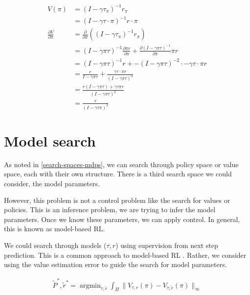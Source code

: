 \begin{align*}
V(\pi) &= (I − \gamma \tau_{\pi})^{−1}r_{\pi} \tag{value functional}\\
&= (I − \gamma \tau\cdot \pi)^{−1}r\cdot \pi \\
\frac{\partial V}{\partial \pi} &= \frac{\partial}{\partial \pi}((I-\gamma \tau_{\pi})^{-1} r_{\pi}) \\
&= (I-\gamma \pi \tau)^{-1} \frac{\partial \pi r}{\partial \pi}+   \frac{\partial (I-\gamma \pi \tau)^{-1}}{\partial \pi}\pi r\tag{product rule} \\
&= (I-\gamma \pi \tau)^{-1} r + -(I-\gamma \pi \tau)^{-2} \cdot -\gamma \tau\cdot \pi r\\
&= \frac{r}{I-\gamma \pi \tau} + \frac{ \gamma \tau\cdot \pi r}{(I-\gamma \pi \tau)^2} \tag{rewrite as fractions}\\
&= \frac{r(I-\gamma \pi \tau) + \gamma \tau \pi r}{(I-\gamma \pi \tau)^2} \tag{common demoninator}\\
& = \frac{r}{(I-\gamma \tau \pi)^2} \tag{cancel}
\end{align*}

\newpage
\section{Model search} \label{model-iteration}

As noted in \ref{search-spaces-mdps}, we can search through policy space or value
space, each with their own structure.
There is a third search space we could consider, the model parameters.

However, this problem is not a control problem like the search for values or policies.
This is an inference problem, we are trying to infer the model parameters.
Once we know these parameters, we can apply control.
In general, this is known as model-based RL.

We could search through models ($\tau, r$) using supervision from next step prediction.
This is a common approach to model-based RL \cite{Wang2019a}.
Rather, we consider using the value estimation error to guide the search for model parameters.

\begin{align}
\tilde P^{* }, \tilde r^{* } = \mathop{\text{argmin}}_{\tilde \tau, \tilde r} \int_{\Pi} \parallel V_{\tau, r}(\pi)-V_{\tilde \tau, \tilde r}(\pi) \parallel_\infty
\end{align}

